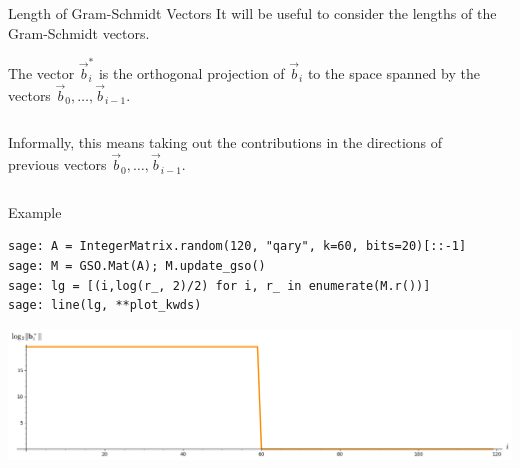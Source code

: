 \documentclass[xcolor=table,10pt,aspectratio=169]{beamer}
\begin{document}
\begin{frame}[label={sec:org830a9b2}]{Length of Gram-Schmidt Vectors}
It will be useful to consider the lengths of the Gram-Schmidt vectors.

The vector \(\vec{b}^*_i\) is the orthogonal projection of \(\vec{b}_i\) to the space spanned by the vectors \(\vec{b}_0, \ldots, \vec{b}_{i-1}\).

\begin{columns}
\begin{column}{0.45\columnwidth}
Informally, this means taking out the contributions in the directions of previous vectors  \(\vec{b}_0, \ldots, \vec{b}_{i-1}\).
\end{column}

\begin{column}{0.45\columnwidth}
\end{column}
\end{columns}
\end{frame}

\begin{frame}[label={sec:orgeadea81},fragile]{Example}
 \lstset{language=sage,label= ,caption= ,captionpos=b,numbers=none}
\begin{lstlisting}
sage: A = IntegerMatrix.random(120, "qary", k=60, bits=20)[::-1]
sage: M = GSO.Mat(A); M.update_gso()
sage: lg = [(i,log(r_, 2)/2) for i, r_ in enumerate(M.r())]
sage: line(lg, **plot_kwds)
\end{lstlisting}

\begin{center}
\includegraphics[width=.9\linewidth]{gram-schmidt-norms.png}
\end{center}
\end{frame}
\end{document}
